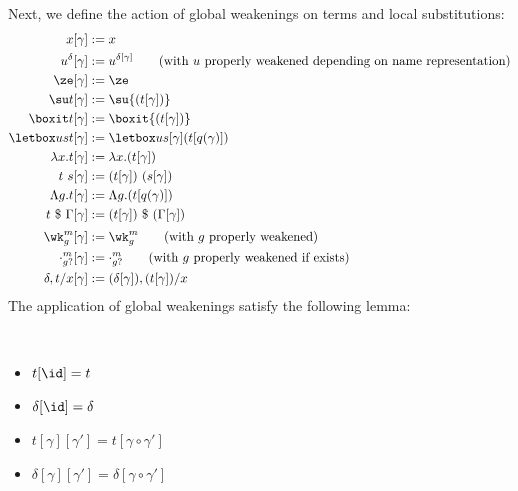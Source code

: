 Next, we define the action of global weakenings on terms and local substitutions:
\begin{align*}
  x[\gamma] &:= x \\
  u^\delta[\gamma] &:= u^{\delta[\gamma]}
                     \tag{with $u$ properly weakened depending on name representation} \\
  \ze[\gamma] &:= \ze \\
  \su t[\gamma] &:= \su {(t[\gamma])} \\
  \boxit t[\gamma] &:= \boxit {(t[\gamma])} \\
  \letbox u s t[\gamma] &:= \letbox u {s[\gamma]} {(t[q(\gamma)])} \\
  \lambda x. t[\gamma] &:= \lambda x. {(t[\gamma])} \\
  t~s[\gamma] &:= (t[\gamma])~(s[\gamma]) \\
  \Lambda g. t[\gamma] &:= \Lambda g. {(t[q(\gamma)])} \\
  t~\$~\Gamma[\gamma] &:= (t[\gamma])~\$~(\Gamma[\gamma]) \\[0.25em]
  \wk_g^m[\gamma] &:= \wk_g^m
                     \tag{with $g$ properly weakened} \\
  \cdot_{g?}^m[\gamma] &:= \cdot_{g?}^m
                         \tag{with $g$ properly weakened if exists} \\
  \delta, t/x[\gamma] &:= (\delta[\gamma]), (t[\gamma])/x
\end{align*}
The application of global weakenings satisfy the following lemma:
\begin{lemma}$ $
  \begin{itemize}
  \item $t[\id] = t$
  \item $\delta[\id] = \delta$
  \item $t[\gamma][\gamma'] = t[\gamma \circ \gamma']$
  \item $\delta[\gamma][\gamma'] = \delta[\gamma \circ \gamma']$
  \end{itemize}
\end{lemma}

